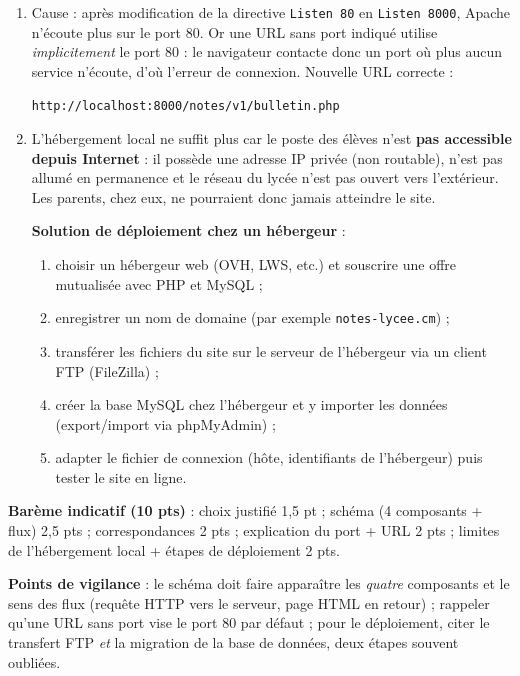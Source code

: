\documentclass[11pt]{article}
\begin{document}
\begin{corrige}
\begin{enumerate}
\begin{itemize}
\item \texttt{C:\textbackslash xampp\textbackslash htdocs\textbackslash notes\textbackslash style.css} $\rightarrow$ \texttt{http://localhost/notes/style.css} (on remplace le DocumentRoot \texttt{C:\textbackslash xampp\textbackslash htdocs} par \texttt{http://localhost}).
\end{itemize}
\item Cause : après modification de la directive \texttt{Listen 80} en \texttt{Listen 8000}, Apache n'écoute plus sur le port 80. Or une URL sans port indiqué utilise \emph{implicitement} le port 80 : le navigateur contacte donc un port où plus aucun service n'écoute, d'où l'erreur de connexion. Nouvelle URL correcte :
\begin{center}
\texttt{http://localhost:8000/notes/v1/bulletin.php}
\end{center}
\item L'hébergement local ne suffit plus car le poste des élèves n'est \textbf{pas accessible depuis Internet} : il possède une adresse IP privée (non routable), n'est pas allumé en permanence et le réseau du lycée n'est pas ouvert vers l'extérieur. Les parents, chez eux, ne pourraient donc jamais atteindre le site.\par
\textbf{Solution de déploiement chez un hébergeur} :
\begin{enumerate}
\item choisir un hébergeur web (OVH, LWS, etc.) et souscrire une offre mutualisée avec PHP et MySQL ;
\item enregistrer un nom de domaine (par exemple \texttt{notes-lycee.cm}) ;
\item transférer les fichiers du site sur le serveur de l'hébergeur via un client FTP (FileZilla) ;
\item créer la base MySQL chez l'hébergeur et y importer les données (export/import via phpMyAdmin) ;
\item adapter le fichier de connexion (hôte, identifiants de l'hébergeur) puis tester le site en ligne.
\end{enumerate}
\end{enumerate}
\textbf{Barème indicatif (10 pts)} : choix justifié 1,5 pt ; schéma (4 composants + flux) 2,5 pts ; correspondances 2 pts ; explication du port + URL 2 pts ; limites de l'hébergement local + étapes de déploiement 2 pts.\par
\textbf{Points de vigilance} : le schéma doit faire apparaître les \emph{quatre} composants et le sens des flux (requête HTTP vers le serveur, page HTML en retour) ; rappeler qu'une URL sans port vise le port 80 par défaut ; pour le déploiement, citer le transfert FTP \emph{et} la migration de la base de données, deux étapes souvent oubliées.
\end{corrige}
\end{document}
